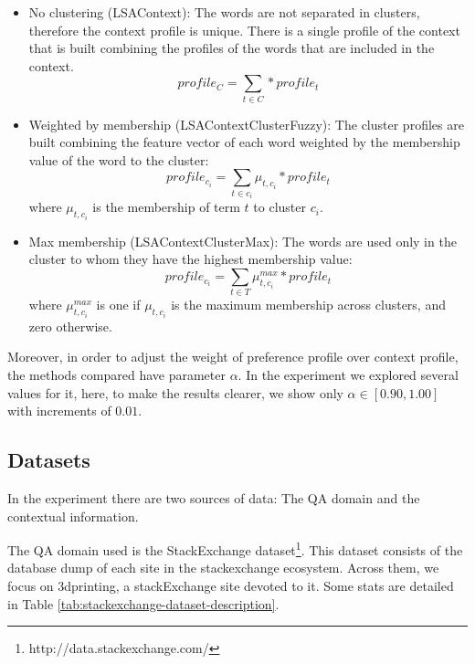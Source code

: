 \documentclass[preprint]{elsarticle}
\begin{document}
\begin{spacing}{1.5}
\begin{itemize}

	\item No clustering (LSAContext): The words are not separated in clusters, therefore the context profile is unique. There is a single profile of the context that is built combining the profiles of the words that are included in the context.
	\begin{equation}
		profile_{C} = \sum_{t \in C} * profile_t
	\end{equation}

	\item Weighted by membership (LSAContextClusterFuzzy): The cluster profiles are built combining the feature vector of each word weighted by the membership value of the word to the cluster:
	\begin{equation}
		profile_{c_i} = \sum_{t \in c_i} \mu_{t,c_i} * profile_t
	\end{equation}
	\noindent where $\mu_{t,c_i}$ is the membership of term $t$ to cluster $c_i$.

	\item Max membership (LSAContextClusterMax): The words are used only in the cluster to whom they have the highest membership value:
	\begin{equation}
		profile_{c_i} = \sum_{t \in T} \mu^{max}_{t,c_i} * profile_t
	\end{equation}
	\noindent where $\mu^{max}_{t,c_i}$ is one if $\mu_{t,c_i}$ is the maximum membership across clusters, and zero otherwise.

\end{itemize}

Moreover, in order to adjust the weight of preference profile over context profile, the methods compared have parameter $\alpha$. In the experiment we explored several values for it, here, to make the results clearer, we show only $\alpha \in [0.90,1.00]$ with increments of $0.01$.

\subsection{Datasets}
\label{sec:case-study-datasets}

In the experiment there are two sources of data: The QA domain and the contextual information.

The QA domain used is the StackExchange dataset\footnote{http://data.stackexchange.com/}. This dataset consists of the database dump of each site in the stackexchange ecosystem. Across them, we focus on 3dprinting, a stackExchange site devoted to it. Some stats are detailed in Table \ref{tab:stackexchange-dataset-description}.


\end{spacing}
\end{document}
